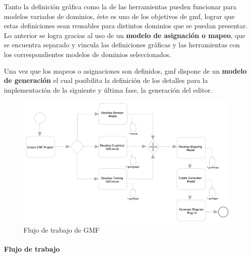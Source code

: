 \documentclass[a4paper,12pt,twoside,spanish,openright]{book}
\begin{document}
Tanto la definición gráfica como la de las herramientas pueden funcionar para modelos variados de dominios, éste es uno de los objetivos de \gls{gmf}, lograr que estas definiciones sean reusables para distintos dominios que se puedan presentar. Lo anterior se logra gracias al uso de un \textbf{modelo de asignación o mapeo}, que se encuentra separado y vincula las definiciones gráficas y las herramientas con los correspondientes modelos de dominios seleccionados.

Una vez que los mapeos o asignaciones son definidos, \gls{gmf} dispone de un \textbf{modelo de generación} el cual posibilita la definición de los detalles para la implementación de la siguiente y última fase, la generación del editor.


\begin{figure}[hbtp]
\centering
\includegraphics[scale=.67]{./img/GMFWorkflow}
\caption{Flujo de trabajo de GMF}
\label{fig:GMFWorkflow}
\end{figure}


\paragraph{Flujo de trabajo}
\end{document}
